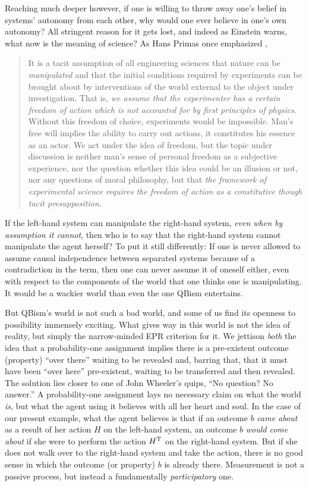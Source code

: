 \documentclass[aps,pra,superscriptaddress,12pt,tightenlines,nofootinbib]{revtex4-2}
\begin{document}
Reaching much deeper however, if one is willing to throw away one's belief in systems' autonomy from each other, why would one ever believe in one's own autonomy?  All stringent reason for it gets lost, and indeed as Einstein warns, what now is the meaning of science?  As Hans Primas once emphasized \cite{Primas90},
\begin{quote}
\noindent It is a tacit assumption of all engineering sciences that nature can be {\it manipulated\/} and that the initial conditions required by experiments can be brought about by interventions of the world external to the object under investigation.  That is, {\it we assume that the experimenter has a certain freedom of action which is not accounted for by first principles of physics}.  Without this freedom of choice, experiments would be impossible.  Man's free will implies the ability to carry out actions, it constitutes his essence as an actor.  We act under the idea of freedom, but the topic under discussion is neither man's sense of personal freedom as a subjective experience, nor the question whether this idea could be an illusion or not, nor any questions of moral philosophy, but that {\it the framework of experimental science requires the freedom of action as a constitutive though tacit presupposition}.
\end{quote}
If the left-hand system can manipulate the right-hand system, {\it even when by assumption it cannot}, then who is to say that the right-hand system cannot manipulate the agent herself?  To put it still differently:  If one is never allowed to assume causal independence between separated systems because of a contradiction in the term, then one can never assume it of oneself either, even with respect to the components of the world that one thinks one is manipulating.  It would be a wackier world than even the one QBism entertains.

But QBism's world is not such a bad world, and some of us find its
openness to possibility immensely exciting.  What gives way in this
world is not the idea of reality, but simply the narrow-minded EPR
criterion for it.  We jettison  {\it both\/} the idea that a probability-one assignment implies there is a pre-existent outcome (property) ``over there'' waiting to be revealed and, barring that, that it must have been ``over here'' pre-existent, waiting to be transferred and then revealed.  The solution lies closer to one of John Wheeler's quips, ``No question? No answer.''  A probability-one assignment lays no necessary claim on what the world {\it is}, but what the agent using it believes with all her heart and soul.  In the case of our present example, what the agent believes is that if an outcome $b$ {\it came about\/} as a result of her action $H$ on the left-hand system, an outcome $b$ {\it would come about\/} if she were to perform the action $H^{\rm T}$ on the right-hand system.  But if she does not walk over to the right-hand system and take the action, there is no good sense in which the outcome (or property) $b$ is already there.  Measurement is not a passive process, but instead a fundamentally {\it participatory\/} one.
\end{document}
